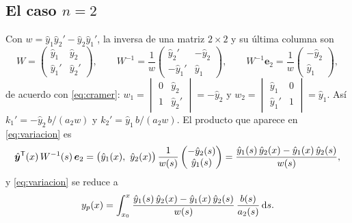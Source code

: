 \subsection{El caso \texorpdfstring{$n=2$}{n = 2}}\label{sec:n2}
Con $w=\hat y_1\hat y_2'-\hat y_2\hat y_1'$, la inversa de una matriz
$2\times2$ y su última columna son
\[
  W=\begin{pmatrix}\hat y_1 & \hat y_2\\ \hat y_1' & \hat y_2'\end{pmatrix},
  \qquad
  W^{-1}=\frac1w\begin{pmatrix}\hat y_2' & -\hat y_2\\ -\hat y_1' & \hat y_1\end{pmatrix},
  \qquad
  W^{-1}\bm e_2=\frac1w\begin{pmatrix}-\hat y_2\\ \hat y_1\end{pmatrix},
\]
de acuerdo con \eqref{eq:cramer}: $w_1=\begin{vmatrix}0&\hat y_2\\1&\hat y_2'\end{vmatrix}=-\hat y_2$ y
$w_2=\begin{vmatrix}\hat y_1&0\\\hat y_1'&1\end{vmatrix}=\hat y_1$. Así
$k_1'=-\hat y_2\,b/(a_2w)$ y $k_2'=\hat y_1\,b/(a_2w)$. El producto que aparece
en \eqref{eq:variacion} es
\[
  \hat{\bm y}^{\mathsf{T}}(x)\,W^{-1}(s)\,\bm e_2
  =\bigl(\hat y_1(x),\ \hat y_2(x)\bigr)\,\frac{1}{w(s)}\begin{pmatrix}-\hat y_2(s)\\ \hat y_1(s)\end{pmatrix}
  =\frac{\hat y_1(s)\,\hat y_2(x)-\hat y_1(x)\,\hat y_2(s)}{w(s)},
\]
y \eqref{eq:variacion} se reduce a
\begin{equation}\label{eq:variacion-n2}
  y_p(x)=\int_{x_0}^{x}\frac{\hat y_1(s)\,\hat y_2(x)-\hat y_1(x)\,\hat y_2(s)}{w(s)}\,\frac{b(s)}{a_2(s)}\,\mathrm{d} s .
\end{equation}

